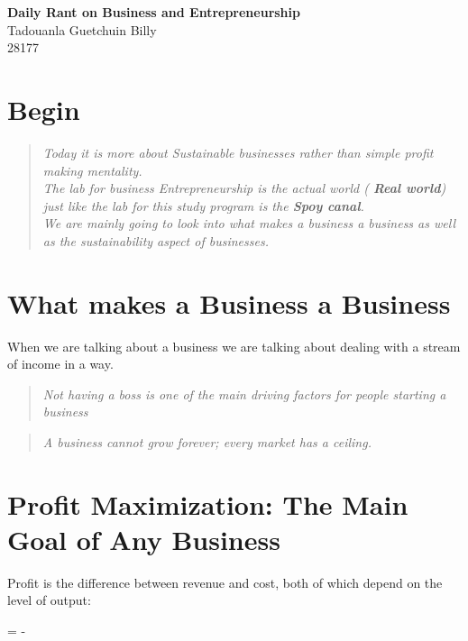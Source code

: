 \documentclass[11pt, a4paper]{article}
\begin{document}
\begin{center}
  \LARGE\textbf{Daily Rant on Business and Entrepreneurship}\\
  Tadouanla Guetchuin Billy\\
  28177
\end{center}

\section{Begin}
\begin{quote}
  \textit {Today it is more about Sustainable businesses rather than simple profit making
    mentality.}\\

  \textit {The lab for business Entrepreneurship is the actual world ( \textbf{Real world})
    just like the lab for this study program is the \textbf{Spoy canal}.}\\

  \textit{We are mainly going to look into what makes a business a business as well as the
    sustainability aspect of businesses.}
\end{quote}

\section{What makes a Business a Business}
When we are talking about a business we are talking about dealing with a stream of income in
a way.

\begin{quote}
  \itshape
  Not having a boss is one of the main driving factors for people starting a
  business
\end{quote}

\begin{quote}
  \itshape
  A business cannot grow forever; every market has a ceiling.
\end{quote}

\section{Profit Maximization: The Main Goal of Any Business}
Profit is the difference between revenue and cost, both of which depend on
the level of output:

\begin{center}
   =  - 
\end{center}
\end{document}
